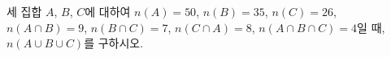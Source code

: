 세 집합 $A$, $B$, $C$에 대하여 $n(A)=50$, $n(B)=35$, $n(C)=26$, $n(A\cap B)=9$, $n(B\cap C)=7$, $n(C\cap A)=8$, $n(A\cap B\cap C)=4$일 때, $n(A\cup B\cup C)$를 구하시오.
